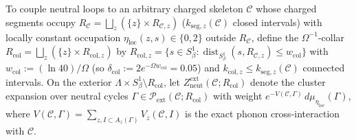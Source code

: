 \documentclass[11pt]{article}
\theoremstyle{definition}
\theoremstyle{remark}
\begin{document}
To couple neutral loops to an arbitrary charged skeleton $\mathcal{C}$ whose
charged segments occupy $R_{\mathcal{C}} = \bigsqcup_z (\{z\}\times R_{\mathcal{C},z})$
($k_{\mathrm{seg},z}(\mathcal{C})$ closed intervals) with locally constant
occupation $\eta_{\mathrm{loc}}(z, s) \in \{0,2\}$ outside $R_{\mathcal{C}}$,
define the $\Omega^{-1}$-collar $R_{\mathrm{col}} = \bigsqcup_z (\{z\}\times R_{\mathrm{col},z})$
by $R_{\mathrm{col},z} = \{s \in S^1_\beta : \operatorname{dist}_{S^1_\beta}(s, R_{\mathcal{C},z}) \le w_{\mathrm{col}}\}$
with $w_{\mathrm{col}} := (\ln 40)/\Omega$ (so $\delta_{\mathrm{col}} := 2e^{-\Omega w_{\mathrm{col}}} = 0.05$)
and $k_{\mathrm{col},z} \le k_{\mathrm{seg},z}(\mathcal{C})$ connected intervals.
On the exterior $\Lambda \times S^1_\beta \setminus R_{\mathrm{col}}$, let
$Z_{\mathrm{neut}}^{\mathrm{ext}}(\mathcal{C}; R_{\mathrm{col}})$ denote the
cluster expansion over neutral cycles $\Gamma \in \mathcal{P}_{\mathrm{ext}}(\mathcal{C}; R_{\mathrm{col}})$
with weight $e^{-V(\mathcal{C},\Gamma)}\,d\mu_{\eta_{\mathrm{loc}}}(\Gamma)$,
where $V(\mathcal{C},\Gamma) = \sum_{z, I \subset A_z(\Gamma)} V_z(\mathcal{C}, I)$
is the exact phonon cross-interaction with $\mathcal{C}$.
\end{document}
